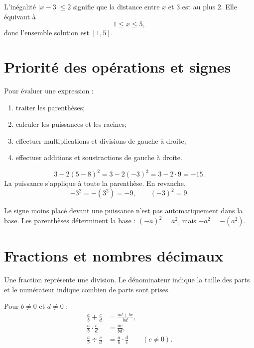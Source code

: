 \documentclass[12pt,a4paper,openany]{book}
\newcommand{\abs}[1]{\left\lvert #1\right\rvert}
\begin{document}
\begin{examplebox}
L'inégalité $\abs{x-3}\le2$ signifie que la distance entre $x$ et $3$ est au plus $2$. Elle équivaut à
\[
1\le x\le5,
\]
donc l'ensemble solution est $[1,5]$.
\end{examplebox}

\section{Priorité des opérations et signes}

\begin{methodbox}
Pour évaluer une expression :
\begin{enumerate}
\item traiter les parenthèses;
\item calculer les puissances et les racines;
\item effectuer multiplications et divisions de gauche à droite;
\item effectuer additions et soustractions de gauche à droite.
\end{enumerate}
\end{methodbox}

\begin{examplebox}
\[
3-2(5-8)^2=3-2(-3)^2=3-2\cdot9=-15.
\]
La puissance s'applique à toute la parenthèse. En revanche,
\[
-3^2=-(3^2)=-9,\qquad (-3)^2=9.
\]
\end{examplebox}

\begin{warningbox}
Le signe moins placé devant une puissance n'est pas automatiquement dans la base. Les parenthèses déterminent la base : $(-a)^2=a^2$, mais $-a^2=-(a^2)$.
\end{warningbox}

\section{Fractions et nombres décimaux}

\begin{intuitionbox}
Une fraction représente une division. Le dénominateur indique la taille des parts et le numérateur indique combien de parts sont prises.
\end{intuitionbox}

Pour $b\neq0$ et $d\neq0$ :
\begin{align*}
\frac ab+\frac cd&=\frac{ad+bc}{bd},\\
\frac ab\cdot\frac cd&=\frac{ac}{bd},\\
\frac ab\div\frac cd&=\frac ab\cdot\frac dc\qquad(c\neq0).
\end{align*}
\end{document}
